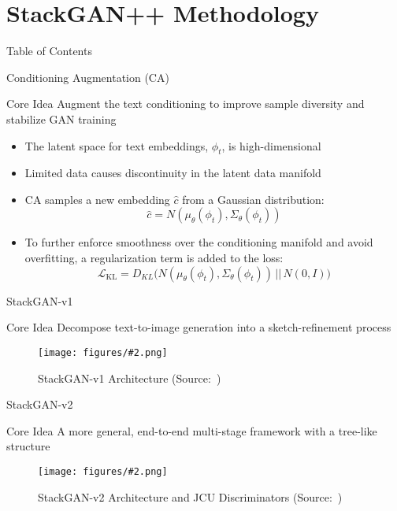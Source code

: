 \documentclass{beamer}
\newcommand{\paperfigure}[3][width=\textwidth]{%
    \begin{figure}%
        \centering%
        \texttt{[image: figures/\#2.png]}%
        \caption{#3 (Source:~\cite{stackgan++})}%
    \end{figure}%
}
\begin{document}
\section{StackGAN++ Methodology}
\begin{frame}{Table of Contents}
    \tableofcontents[currentsection]
\end{frame}

\begin{frame}{Conditioning Augmentation (CA)}
    \centering
    \begin{minipage}{0.8\textwidth}
        \begin{block}{Core Idea}
            \centering
            Augment the text conditioning to improve sample diversity and stabilize GAN training
        \end{block}
    \end{minipage}
    \vspace{1em}
    \begin{itemize}
        \item The latent space for text embeddings, $\phi_t$, is high-dimensional
        \item Limited data causes discontinuity in the latent data manifold
        \item CA samples a new embedding $\hat{c}$ from a Gaussian distribution:
        \[
        \hat{c} = N(\mu_\theta(\phi_t), \Sigma_\theta(\phi_t))
        \]
        \item To further enforce smoothness over the conditioning manifold and avoid overﬁtting, a regularization term is added to the loss:
        \[
        \mathcal{L}_{\text{KL}} = D_{KL}\big(N(\mu_\theta(\phi_t), \Sigma_\theta(\phi_t))\, ||\, N(0, I)\big)
        \]
    \end{itemize}  
\end{frame}

\begin{frame}{StackGAN-v1}
    \centering
    \begin{minipage}{0.8\textwidth}
        \begin{block}{Core Idea}
            \centering
            Decompose text-to-image generation into a sketch-refinement process
        \end{block}
    \end{minipage}
    \paperfigure[width=0.9\textwidth]{stackgan_v1}{StackGAN-v1 Architecture}
\end{frame}

\begin{frame}{StackGAN-v2}
    \centering
    \begin{minipage}{0.8\textwidth}
        \begin{block}{Core Idea}
            \centering
            A more general, end-to-end multi-stage framework with a tree-like structure
        \end{block}
    \end{minipage}
    \paperfigure[width=0.9\textwidth]{stackgan_v2}{StackGAN-v2 Architecture and JCU Discriminators}
\end{frame}
\end{document}
